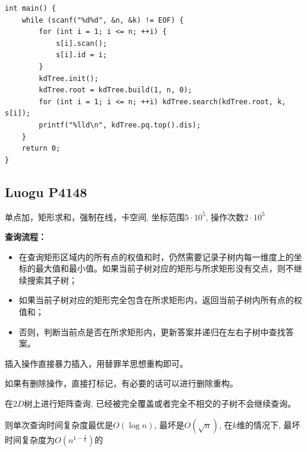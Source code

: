 \begin{lstlisting}
int main() {
	while (scanf("%d%d", &n, &k) != EOF) { 
		for (int i = 1; i <= n; ++i) {
			s[i].scan();
			s[i].id = i;
		}	
		kdTree.init();
		kdTree.root = kdTree.build(1, n, 0);
		for (int i = 1; i <= n; ++i) kdTree.search(kdTree.root, k, s[i]);
		printf("%lld\n", kdTree.pq.top().dis);
	}
    return 0;
}
\end{lstlisting}

\subsection{Luogu P4148}

单点加，矩形求和，强制在线，卡空间, 坐标范围$5 \cdot 10^5$, 操作次数$2 \cdot 10^5$\par


\textbf{查询流程：}
\begin{itemize}
\item 在查询矩形区域内的所有点的权值和时，仍然需要记录子树内每一维度上的坐标的最大值和最小值。如果当前子树对应的矩形与所求矩形没有交点，则不继续搜索其子树；
\item 如果当前子树对应的矩形完全包含在所求矩形内，返回当前子树内所有点的权值和；
\item 否则，判断当前点是否在所求矩形内，更新答案并递归在左右子树中查找答案。
\end{itemize}

插入操作直接暴力插入，用替罪羊思想重构即可。\par
如果有删除操作，直接打标记，有必要的话可以进行删除重构。\par

在$2D$树上进行矩阵查询, 已经被完全覆盖或者完全不相交的子树不会继续查询。\par
则单次查询时间复杂度最优是$O(\log n)$, 最坏是$O(\sqrt{n})$, 在$k$维的情况下, 最坏时间复杂度为$O(n^{1 - \frac{1}{k}})$的

